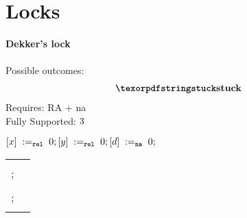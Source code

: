 
\section{Locks}
\label{app:locks}

\begin{minipage}[t]{0.4\linewidth}
\textbf{Dekker's lock}\\\\
Possible outcomes:\\
\[\begin{array}{l}
  \Stuck
\end{array}\]
Requires: RA + na\\
Fully Supported: $\tick$\\
\end{minipage}
%
\codePrefix
$[x] \;:=_{{\mathtt{rel}}}\;0; [y] \;:=_{{\mathtt{rel}}}\;0; [d] \;:=_{\mathtt{na}}\;0;$ \\
\begin{tabular}{L || L}
  \begin{array}{@{}l@{}}
    ; \\
    ; \\
  \end{array} &
  \begin{array}{@{}l@{}}
    ; \\
    ; \\
  \end{array}
\end{tabular}
\codePostfix

